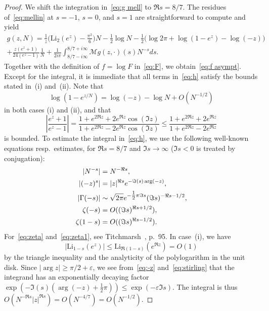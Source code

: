 \documentclass[a4paper]{amsart}
\begin{document}
\begin{proof}
    We shift the integration in~\eqref{eq:g mell} to $\Re s=8/7$.
   The residues of~\eqref{eq:mellin} at $s=-1$, $s=0$, and $s=1$ are straightforward
   to compute and yield
  \begin{multline*}
         g(z,N) = \frac{1}{z}\Big( \mathrm{Li}_2(e^z) - \frac{\pi^2}{6}\Big)N
   - \frac12 \log N 
    - \frac12 \Big(\log 2\pi    +\log(1-e^{z})  - \log(-z)\Big)\\
         + \frac{z(e^z+1)}{24(e^z-1)} \frac1N
         +\frac{1}{2i\pi}\int_{8/7-i\infty}^{8/7+i\infty}  \mathcal{M}g(z,\cdot)(s) N^{-s} ds.
  \end{multline*}
   Together with the definition of $f=\log F$ in~\eqref{eq:F}, we obtain~\eqref{eq:f asympt}.
   Except for the integral, it is immediate that all terms in~\eqref{eq:h} satisfy
   the bounds stated in~(i) and~(ii). Note  that
   \[
     \log(1-e^{z/N}) = \log(-z) - \log N + O(N^{-1/2})
   \]
   in both cases (i) and (ii), and that
   \[
    \left |\frac{e^z+1}{e^z-1}\right| 
      = \frac{1+e^{2 \Re z} +2e^{ \Re z} \cos(\Im z)}
        {1+e^{2 \Re z} -2e^{ \Re z} \cos(\Im z)}
      \leq \frac{1+e^{2 \Re z} +2e^{ \Re z} }
        {1+e^{2 \Re z} -2e^{ \Re z} }
  \]
  is bounded. To estimate the integral in~\eqref{eq:h}, we use
  the following well-known equations resp.\ estimates, for $\Re s= 8/7$ and
  $\Im s\to \infty$ ($\Im s<0$ is treated by conjugation):
  \begin{align}
    |N^{-s}| &= N^{-\Re s}, \notag \\
    |(-z)^s| &= |z|^{\Re s} e^{-\Im(s) \arg(-z)}, \label{eq:-z} \\
    |\Gamma(-s)| &\sim \sqrt{2\pi} e^{-\tfrac12\pi \Im s} (\Im s)^{-\Re s - 1/2},  \label{eq:stirling}  \\
    \zeta(-s) &= O((\Im s)^{\Re s+1/2}),  \label{eq:zeta} \\
    \zeta(1-s)&= O((\Im s)^{ \Re s-1/2}).   \label{eq:zeta1}
  \end{align}
  For~\eqref{eq:zeta} and~\eqref{eq:zeta1}, see Titchmarsh~\cite{Ti86}, p.~95.
  In case~(i), we have
  \[
    |\mathrm{Li}_{1-s}(e^z) | \leq \mathrm{Li}_{\Re(1-s)}(e^{\Re z}) = O(1)
  \]
  by the triangle inequality and the analyticity of the polylogarithm
  in the unit disk.
  Since $|\arg z|\geq \pi/2+\varepsilon$, we see from~\eqref{eq:-z}
  and~\eqref{eq:stirling} that the integrand has an exponentially decaying factor
  $\exp(-\Im(s) (\arg(-z) + \tfrac12 \pi )) \leq \exp(-\varepsilon\Im s)$.
  The integral is thus $O(N^{-\Re s}|z|^{\Re s})=O(N^{-4/7})=O(N^{-1/2})$.
  

\end{proof}
\end{document}
